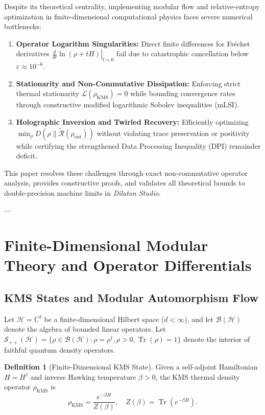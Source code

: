 \documentclass[11pt,a4paper]{article}
\theoremstyle{plain}
\theoremstyle{definition}
\newtheorem{definition}[theorem]{Definition}
\DeclareMathOperator{\Tr}{Tr}
\newcommand{\KMS}{\mathrm{KMS}}
\begin{document}
Despite its theoretical centrality, implementing modular flow and relative-entropy optimization in finite-dimensional computational physics faces severe numerical bottlenecks:
\begin{enumerate}
    \item \textbf{Operator Logarithm Singularities:} Direct finite differences for Fr\'{e}chet derivatives $\left.\frac{d}{dt}\ln(\rho + t H)\right|_{t=0}$ fail due to catastrophic cancellation below $\varepsilon \approx 10^{-6}$.
    \item \textbf{Stationarity and Non-Commutative Dissipation:} Enforcing strict thermal stationarity $\mathcal{L}(\rho_{\KMS}) = 0$ while bounding convergence rates through constructive modified logarithmic Sobolev inequalities (mLSI).
    \item \textbf{Holographic Inversion and Twirled Recovery:} Efficiently optimizing $\min_{\rho} D(\rho \parallel \widetilde{\mathcal{R}}(\rho_{\mathrm{out}}))$ without violating trace preservation or positivity while certifying the strengthened Data Processing Inequality (DPI) remainder deficit.
\end{enumerate}

This paper resolves these challenges through exact non-commutative operator analysis, provides constructive proofs, and validates all theoretical bounds to double-precision machine limits in \textit{Dilaton Studio}.

---

\section{Finite-Dimensional Modular Theory and Operator Differentials}

\subsection{KMS States and Modular Automorphism Flow}
Let $\mathcal{H} = \mathbb{C}^d$ be a finite-dimensional Hilbert space ($d < \infty$), and let $\mathcal{B}(\mathcal{H})$ denote the algebra of bounded linear operators. Let $\mathcal{S}_{++}(\mathcal{H}) = \{\rho \in \mathcal{B}(\mathcal{H}) : \rho = \rho^\dagger, \rho > 0, \Tr(\rho) = 1\}$ denote the interior of faithful quantum density operators.

\begin{definition}[Finite-Dimensional KMS State]
Given a self-adjoint Hamiltonian $H = H^\dagger$ and inverse Hawking temperature $\beta > 0$, the KMS thermal density operator $\rho_{\KMS}$ is
\begin{equation}
\rho_{\KMS} = \frac{e^{-\beta H}}{Z(\beta)}, \quad Z(\beta) = \Tr(e^{-\beta H}).
\end{equation}
\end{definition}
\end{document}
